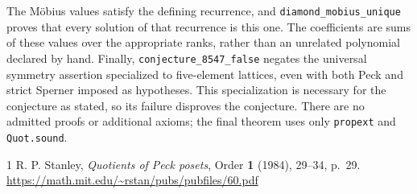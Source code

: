 \documentclass[11pt]{article}
\begin{document}
The M\"obius values satisfy the defining recurrence, and
\texttt{diamond\_mobius\_unique} proves that every solution of that
recurrence is this one.  The coefficients are sums of these values
over the appropriate ranks, rather than an unrelated polynomial
declared by hand.  Finally,
\texttt{conjecture\_8547\_false} negates the universal symmetry
assertion specialized to five-element lattices, even with both Peck
and strict Sperner imposed as hypotheses.  This specialization is
necessary for the conjecture as stated, so its failure disproves the
conjecture.  There are no admitted proofs or additional axioms; the
final theorem uses only \texttt{propext} and \texttt{Quot.sound}.

\begin{thebibliography}{1}
R. P. Stanley, \emph{Quotients of Peck posets},
Order \textbf{1} (1984), 29--34, p.~29.
\url{https://math.mit.edu/~rstan/pubs/pubfiles/60.pdf}
\end{thebibliography}
\end{document}
